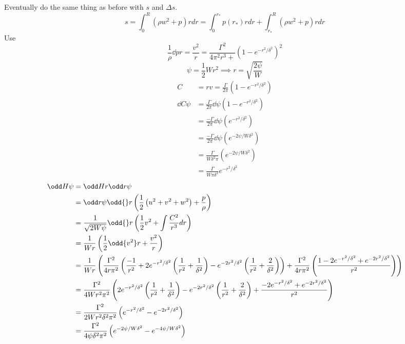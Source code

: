 \documentclass{X:/Documents/Coding/Latex/myreport}
\begin{document}
Eventually do the same thing as before with $s$ and $\Delta s$.
\[s = \int_0^R \left(\rho w^2 + p\right) rdr = \int_0^{r_*} p(r_*) rdr + \int_{r_*}^R \left(\rho w^2 + p\right) rdr\]
Use
\[\frac1\rho \dd p r = \frac{v^2}{r} = \frac{\Gamma^2}{4\pi^2r^3+}\left(1-e^{-r^2/\delta^2}\right)^2\]
\[\psi = \frac12 W r^2 \implies r = \sqrt{\frac{2\psi}{W}}\]
\begin{align*}
    C &= rv = \frac{\Gamma}{2\pi} \left(1-e^{-r^2/\delta^2}\right)\\
    \dd C\psi &=\frac{\Gamma}{2\pi} \dd{}\psi \left(1-e^{-r^2/\delta^2}\right)\\
    &=\frac{-\Gamma}{2\pi} \dd{}\psi \left(e^{-r^2/\delta^2}\right)\\
    &=\frac{-\Gamma}{2\pi} \dd{}\psi \left(e^{-2\psi/W\delta^2}\right)\\
    &=\frac{\Gamma}{W\delta^2\pi} \left(e^{-2\psi/W\delta^2}\right)\\
    &=\frac{\Gamma}{W\pi\delta^2} e^{-r^2/\delta^2}
\end{align*}
\begin{align*}
    \odd H\psi &= \odd H r \odd r\psi \\
    &=\odd r\psi \odd{}r\left(\frac12 \left(u^2+v^2 + w^2\right) + \frac{p}{\rho}\right)\\
    &=\frac{1}{\sqrt{2W\psi}} \odd{}r\left(\frac12 v^2 + \int\frac{C^2}{r^3}dr \right)\\
    &=\frac{1}{Wr} \left(\frac12 \odd{v^2}r + \frac{v^2}{r} \right)\\
    &=\frac{1}{Wr} \left(\frac{\Gamma^2}{4r\pi^2} \left(\frac{-1}{r^2} +2e^{-r^2/\delta^2}\left(\frac{1}{r^2} + \frac{1}{\delta^2}\right) -e^{-2r^2/\delta^2} \left(\frac{1}{r^2} + \frac{2}{ \delta^2}\right)\right) +  \frac{\Gamma^2}{4r\pi^2}\left(\frac{1 - 2e^{-r^2/\delta^2} + e^{-2r^2/\delta^2}}{r^2}\right) \right)\\
    &=\frac{\Gamma^2}{4Wr^2 \pi^2} \left(2e^{-r^2/\delta^2}\left(\frac{1}{r^2} + \frac{1}{\delta^2}\right) -e^{-2r^2/\delta^2} \left(\frac{1}{r^2} + \frac{2}{ \delta^2}\right) +\frac{ - 2e^{-r^2/\delta^2} + e^{-2r^2/\delta^2}}{r^2}\right)\\
    &= \frac{\Gamma^2}{2Wr^2\delta^2\pi^2} \left(e^{-r^2/\delta^2} - e^{-2r^2/\delta^2}\right)\\
    &= \frac{\Gamma^2}{4\psi\delta^2\pi^2} \left(e^{-2\psi/W\delta^2} - e^{-4\psi/W\delta^2}\right)\\
\end{align*}
\end{document}
